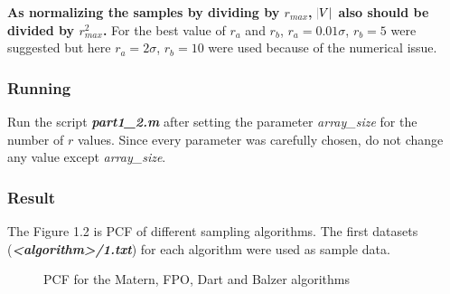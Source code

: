 \documentclass[paper=a4, fontsize=11pt]{scrartcl} %
\numberwithin{equation}{section} %
\numberwithin{figure}{section} %
\numberwithin{table}{section} %
\newcommand{\filename}[1]{\textbf{\textit{#1}}}
\begin{document}
\textbf{As normalizing the samples by dividing by $r_{max}$, $\abs{V}$ also should be divided by $r_{max}^2$.} For the best value of $r_a$ and $r_b$, $r_a = 0.01 \sigma$, $r_b = 5$ were suggested but here $r_a = 2 \sigma$, $r_b = 10$ were used because of the numerical issue. 

\subsubsection{Running}

Run the script \filename{part1\_2.m} after setting the parameter \textit{array\_size} for the number of $r$ values. Since every parameter was carefully chosen, do not change any value except \textit{array\_size}.

\subsubsection{Result}

The Figure 1.2 is PCF of different sampling algorithms. The first datasets (\filename{<algorithm>/1.txt}) for each algorithm were used as sample data.

\begin{figure}[H]
\caption{PCF for the Matern, FPO, Dart and Balzer algorithms\label{fig:simple}}
\noindent{}
\end{figure}
\end{document}
